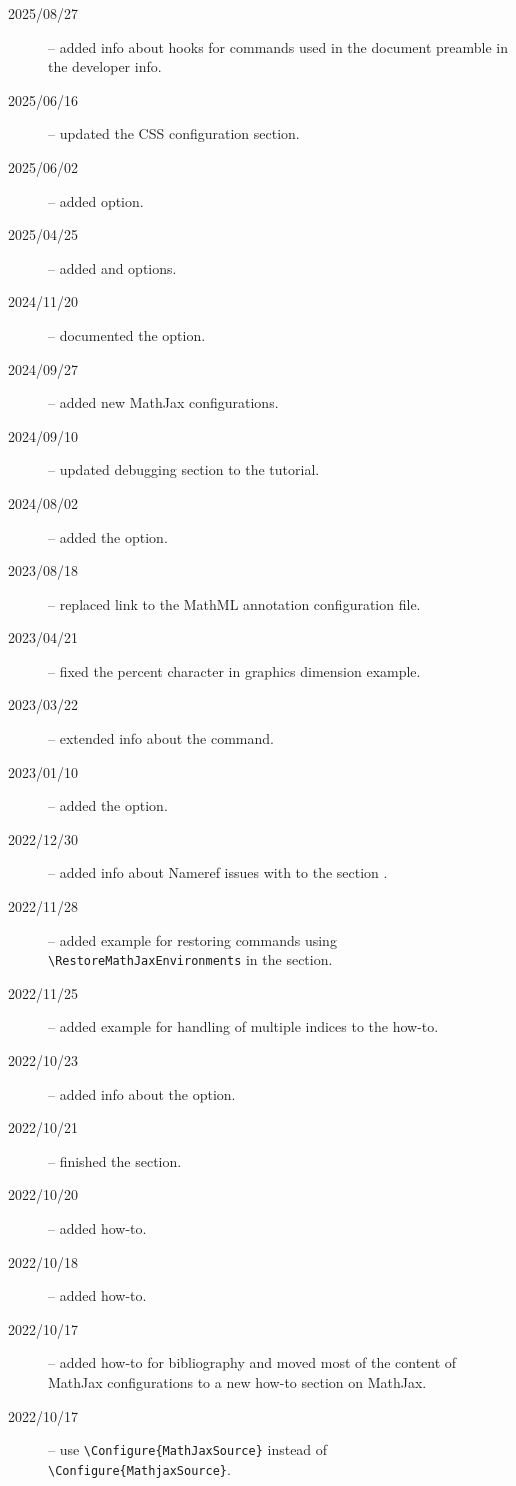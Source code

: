 
\begin{description}
  \item[2025/08/27] -- added info about hooks for commands used in the document preamble in the developer info.
  \item[2025/06/16] -- updated the CSS configuration section.
  \item[2025/06/02] -- added  option.
  \item[2025/04/25] -- added  and  options.
  \item[2024/11/20] -- documented the  option.
  \item[2024/09/27] -- added new MathJax configurations. 
  \item[2024/09/10] -- updated debugging section to the tutorial.
  \item[2024/08/02] -- added the  option.
  \item[2023/08/18] -- replaced link to the MathML annotation configuration file.
  \item[2023/04/21] -- fixed the percent character in graphics dimension example.
  \item[2023/03/22] -- extended info about the  command.
  \item[2023/01/10] -- added the  option.
  \item[2022/12/30] -- added info about Nameref issues with  to the section .
  \item[2022/11/28] -- added example for restoring commands using \verb|\RestoreMathJaxEnvironments| in the  section.
  \item[2022/11/25] -- added example for handling of multiple indices to the  how-to.
  \item[2022/10/23] -- added info about the  option.
  \item[2022/10/21] -- finished the  section.
  \item[2022/10/20] -- added  how-to.
  \item[2022/10/18] -- added  how-to.
  \item[2022/10/17] -- added how-to for bibliography and moved most of the content of MathJax configurations to a new how-to section on MathJax. 
  \item[2022/10/17] -- use \verb|\Configure{MathJaxSource}| instead of \verb|\Configure{MathjaxSource}|.

\end{description}

